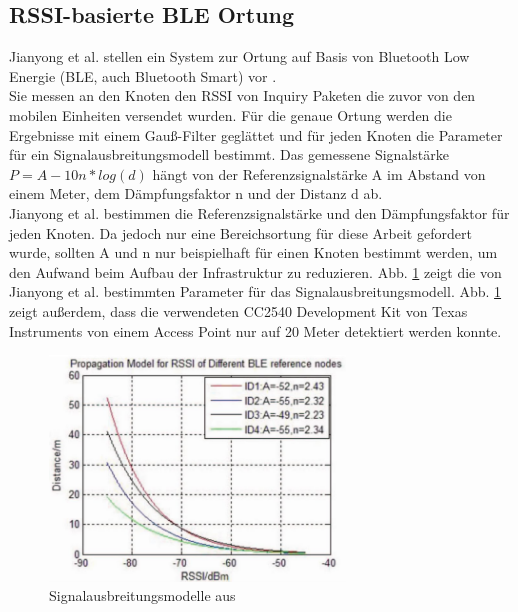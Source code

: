 \subsection{RSSI-basierte BLE Ortung}
Jianyong et al. stellen ein System zur Ortung auf Basis von Bluetooth Low Energie (BLE, auch Bluetooth Smart) vor \cite{jianyong2014rssi}. \\
Sie messen an den Knoten den RSSI von Inquiry Paketen die zuvor von den mobilen Einheiten versendet wurden.
Für die genaue Ortung werden die Ergebnisse mit einem Gauß-Filter geglättet und für jeden Knoten die Parameter für ein Signalausbreitungsmodell bestimmt.
Das gemessene Signalstärke $P = A - 10n*log(d)$ hängt von der Referenzsignalstärke A im Abstand von einem Meter, dem Dämpfungsfaktor n und der Distanz d ab. \\
Jianyong et al. bestimmen die Referenzsignalstärke und den Dämpfungsfaktor für jeden Knoten.
Da jedoch nur eine Bereichsortung für diese Arbeit gefordert wurde, sollten A und n nur beispielhaft für einen Knoten bestimmt werden, um den Aufwand beim Aufbau der Infrastruktur zu reduzieren.
Abb. \ref{fig:blemodel} zeigt die von Jianyong et al. bestimmten Parameter für das Signalausbreitungsmodell. 
Abb. \ref{fig:blemodel} zeigt außerdem, dass die verwendeten CC2540 Development Kit von Texas Instruments von einem Access Point nur auf 20 Meter detektiert werden konnte.

\begin{figure}[h]
  \centering
	\includegraphics[width=0.7\textwidth]{images/blemodel.png}
  \caption{Signalausbreitungsmodelle aus \cite{jianyong2014rssi}}
  \label{fig:blemodel}
\end{figure}
